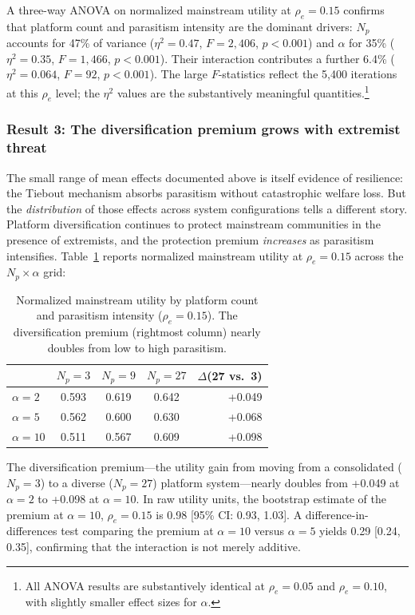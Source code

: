 A three-way ANOVA on normalized mainstream utility at $\rho_e = 0.15$ confirms that platform count and parasitism intensity are the dominant drivers: $N_p$ accounts for 47\% of variance ($\eta^2 = 0.47$, $F = 2{,}406$, $p < 0.001$) and $\alpha$ for 35\% ($\eta^2 = 0.35$, $F = 1{,}466$, $p < 0.001$). Their interaction contributes a further 6.4\% ($\eta^2 = 0.064$, $F = 92$, $p < 0.001$). The large $F$-statistics reflect the 5,400 iterations at this $\rho_e$ level; the $\eta^2$ values are the substantively meaningful quantities.\footnote{All ANOVA results are substantively identical at $\rho_e = 0.05$ and $\rho_e = 0.10$, with slightly smaller effect sizes for $\alpha$.}

\subsubsection{Result 3: The diversification premium grows with extremist threat}

The small range of mean effects documented above is itself evidence of resilience: the Tiebout mechanism absorbs parasitism without catastrophic welfare loss. But the \textit{distribution} of those effects across system configurations tells a different story. Platform diversification continues to protect mainstream communities in the presence of extremists, and the protection premium \textit{increases} as parasitism intensifies. Table~\ref{tab:divpremium} reports normalized mainstream utility at $\rho_e = 0.15$ across the $N_p \times \alpha$ grid:

\begin{table}[t]
\centering
\small
\begin{tabular}{lcccr}
\hline
 & $N_p = 3$ & $N_p = 9$ & $N_p = 27$ & $\Delta$(27 vs.\ 3) \\
\hline
$\alpha = 2$  & 0.593 & 0.619 & 0.642 & +0.049 \\
$\alpha = 5$  & 0.562 & 0.600 & 0.630 & +0.068 \\
$\alpha = 10$ & 0.511 & 0.567 & 0.609 & +0.098 \\
\hline
\end{tabular}
\caption{Normalized mainstream utility by platform count and parasitism intensity ($\rho_e = 0.15$). The diversification premium (rightmost column) nearly doubles from low to high parasitism.}
\label{tab:divpremium}
\end{table}

The diversification premium---the utility gain from moving from a consolidated ($N_p = 3$) to a diverse ($N_p = 27$) platform system---nearly doubles from +0.049 at $\alpha = 2$ to +0.098 at $\alpha = 10$. In raw utility units, the bootstrap estimate of the premium at $\alpha = 10$, $\rho_e = 0.15$ is 0.98 [95\% CI: 0.93, 1.03]. A difference-in-differences test comparing the premium at $\alpha = 10$ versus $\alpha = 5$ yields 0.29 [0.24, 0.35], confirming that the interaction is not merely additive.

